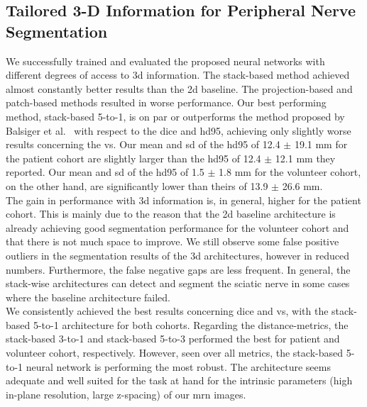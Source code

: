 \subsection{Tailored 3-D Information for Peripheral Nerve Segmentation}
We successfully trained and evaluated the proposed neural networks with different degrees of access to \gls{3d} information. The stack-based method achieved almost constantly better results than the \gls{2d} baseline. The projection-based and patch-based methods resulted in worse performance. Our best performing method, stack-based 5-to-1, is on par or outperforms the method proposed by Balsiger et al.~\cite{Balsiger2018SegmentationApproach} with respect to the \acrlong{dice} and \acrlong{hd95}, achieving only slightly worse results concerning the \acrlong{vs}. Our mean and \gls{sd} of the \gls{hd95} of 12.4 $\pm$ 19.1 mm for the patient cohort are slightly larger than the \gls{hd95} of 12.4 $\pm$ 12.1 mm they reported. Our mean and \gls{sd} of the \gls{hd95} of 1.5 $\pm$ 1.8 mm for the volunteer cohort, on the other hand, are significantly lower than theirs of 13.9 $\pm$ 26.6 mm.\\
The gain in performance with \gls{3d} information is, in general, higher for the patient cohort. This is mainly due to the reason that the \gls{2d} baseline architecture is already achieving good segmentation performance for the volunteer cohort and that there is not much space to improve. We still observe some false positive outliers in the segmentation results of the \gls{3d} architectures, however in reduced numbers. Furthermore, the false negative gaps are less frequent. In general, the stack-wise architectures can detect and segment the sciatic nerve in some cases where the baseline architecture failed.\\
We consistently achieved the best results concerning \acrlong{dice} and \acrlong{vs}, with the stack-based 5-to-1 architecture for both cohorts. Regarding the distance-metrics, the stack-based 3-to-1 and stack-based 5-to-3 performed the best for patient and volunteer cohort, respectively. However, seen over all metrics, the stack-based 5-to-1 neural network is performing the most robust. The architecture seems adequate and well suited for the task at hand for the intrinsic parameters (high in-plane resolution, large z-spacing) of our \gls{mrn} images.

